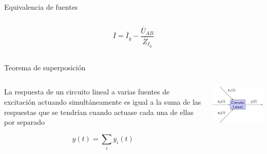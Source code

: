 \documentclass[aspectratio=169, usenames,svgnames,dvipsnames]{beamer}
\begin{document}
\begin{frame}[label={sec:org1c871b9}]{Equivalencia de fuentes}
\begin{columns}
\begin{column}{0.33\columnwidth}
\begin{center}
\end{center}
\[
  \overline{I} = \overline{I}_g - \frac{\overline{U}_{AB}}{\overline{Z}_{I_g}}
\]
\end{column}
\end{columns}
\end{frame}


\begin{frame}[label={sec:org6ffc400}]{Teorema de superposición}
\begin{columns}
\begin{column}{0.5\columnwidth}
La respuesta de un \alert{circuito lineal} a varias fuentes de excitación actuando simultáneamente es igual a la suma de las respuestas que se tendrían cuando actuase cada una de ellas por separado

\[
y(t) = \sum_i y_i(t)
\]
\end{column}

\begin{column}{0.5\columnwidth}
\begin{center}
\includegraphics[width=.9\linewidth]{../figs/superposicion.pdf}
\end{center}
\end{column}
\end{columns}
\end{frame}
\end{document}
